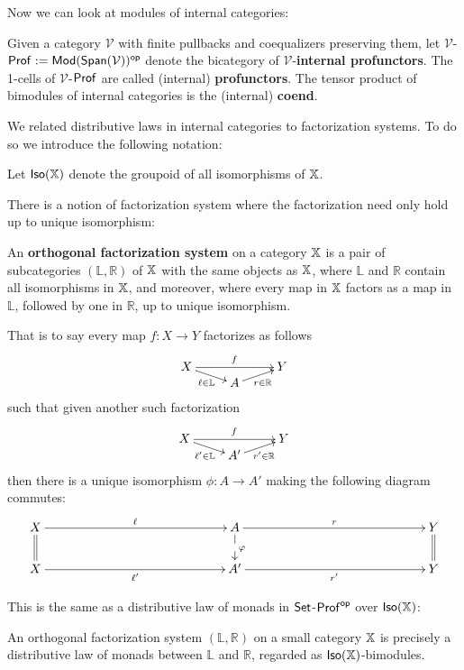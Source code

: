 Now we can look at modules of internal categories:
\begin{definition}
\label{def:internalprof}
Given a category $\mathcal V$ with finite pullbacks and coequalizers preserving them, let $\mathcal V$-${\sf Prof}:={\sf Mod}(\mathsf{Span}(\mathcal V))^{\mathsf{op}}$ denote the bicategory of $\mathcal V$-{\bf internal profunctors}.  
The 1-cells of $\mathcal V$-${\sf Prof}$ are called (internal) {\bf  profunctors}.
The tensor product of bimodules of internal categories is the (internal) {\bf coend}.
\end{definition}
We related distributive laws in internal categories to factorization systems.  To do so we introduce the following notation:
\begin{definition}
Let ${\sf Iso}(\mathbb{X})$ denote the groupoid  of all isomorphisms of $\mathbb{X}$.
\end{definition}
There is a notion of factorization system where the factorization need only hold up to unique isomorphism:
\begin{definition}
An {\bf orthogonal factorization system} on a category $\mathbb{X}$ is a pair of subcategories $(\mathbb{L},\mathbb{R})$ of $\mathbb{X}$ with the same objects as $\mathbb{X}$, where $\mathbb{L}$ and $\mathbb{R}$ contain all isomorphisms in $\mathbb{X}$, and moreover, where every map in $\mathbb{X}$ factors as a map in  $\mathbb{L}$, followed by one in $\mathbb{R}$, up to unique isomorphism.


That is to say every map $f:X\to Y$ factorizes as follows
$$\xymatrixrowsep{0mm}
\xymatrix{
X  \ar[rr]^{f} \ar[dr]_{\ell \in {\mathbb L}} &       & Y\\
   & A \ar[ur]_{r \in {\mathbb R}}
}
$$
such that given another such factorization
$$\xymatrixrowsep{0mm}
\xymatrix{
X  \ar[rr]^{f} \ar[dr]_{\ell' \in {\mathbb L}} &       & Y\\
   & A' \ar[ur]_{r' \in {\mathbb R}}
}
$$
then there is a unique isomorphism $\phi:A\to A'$ making the following diagram commutes:
$$
\xymatrixrowsep{7mm}
\xymatrixcolsep{50mm}
\xymatrix{
X \ar@{=}[d] \ar[r]^{\ell}   & A  \ar@{-->}[d]^{\phi} \ar[r]^{r} & Y \ar@{=}[d]\\
X   \ar[r]_{\ell'}                & A' \ar[r]_{r'} & Y
}
$$
\end{definition}
This is the same as a distributive law of monads in $\mathsf{Set}$-${\sf Prof}^{\mathsf{op}}$ over ${\sf Iso}(\mathbb{X})$:
\begin{lemma}
An orthogonal factorization system $(\mathbb{L},\mathbb{R})$ on a small category $\mathbb{X}$ is precisely a distributive law of monads between $\mathbb{L}$ and $\mathbb{R}$, regarded as ${\sf Iso}(\mathbb{X})$-bimodules.
\end{lemma}
